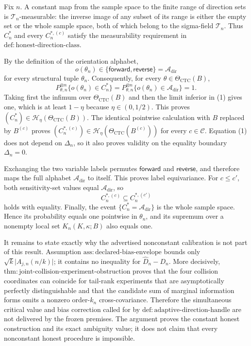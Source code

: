 Fix \(n\).  A constant map from the sample space to the finite range of direction sets is \(\mathcal T_n\)-measurable: the inverse image of any subset of its range is either the empty set or the whole sample space, both of which belong to the sigma-field \(\mathcal T_n\).  Thus \(C_n^*\) and every \(C_n^{*,(c)}\) satisfy the measurability requirement in \(\mathrm{def{:}honest\text{-}direction\text{-}class}\).

By the definition of the orientation alphabet,
\[
 o(\theta_n)\in\{\mathsf{forward},\mathsf{reverse}\}
 =\mathcal A_{\mathrm{dir}}
\]
for every structural tuple \(\theta_n\).  Consequently, for every \(\theta\in\Theta_{\mathrm{CTC}}(B)\),
\[
 P_{\theta,n}^{\otimes n}\{o(\theta_n)\in C_n^*\}
 =P_{\theta,n}^{\otimes n}\{o(\theta_n)\in\mathcal A_{\mathrm{dir}}\}=1. \tag{1}
\]
Taking first the infimum over \(\Theta_{\mathrm{CTC}}(B)\) and then the limit inferior in (1) gives one, which is at least \(1-\eta\) because \(\eta\in(0,1/2)\).  This proves \((C_n^*)\in\mathcal H_\eta(\Theta_{\mathrm{CTC}}(B))\).  The identical pointwise calculation with \(B\) replaced by \(B^{(c)}\) proves \((C_n^{*,(c)})\in\mathcal H_\eta(\Theta_{\mathrm{CTC}}(B^{(c)}))\) for every \(c\in\mathcal C\).  Equation (1) does not depend on \(\Delta_n\), so it also proves validity on the equality boundary \(\Delta_n=0\).

Exchanging the two variable labels permutes \(\mathsf{forward}\) and \(\mathsf{reverse}\), and therefore maps the full alphabet \(\mathcal A_{\mathrm{dir}}\) to itself.  This proves label equivariance.  For \(c\leq c'\), both sensitivity-set values equal \(\mathcal A_{\mathrm{dir}}\), so
\[
 C_n^{*,(c)}\subseteq C_n^{*,(c')}
\]
holds with equality.  Finally, the event \(\{C_n^*=\mathcal A_{\mathrm{dir}}\}\) is the whole sample space.  Hence its probability equals one pointwise in \(\theta_n\), and its supremum over a nonempty local set \(K_n(K,\kappa;B)\) also equals one.

It remains to state exactly why the advertised nonconstant calibration is not part of this result.  Assumption \(\mathrm{ass{:}declared\text{-}bias\text{-}envelope}\) bounds only
\(\sqrt{k}\lvert A_{j,n}(n/k)\rvert\); it contains no inequality for \(\widehat D_n-D_n\).  More decisively, \(\mathrm{thm{:}joint\text{-}collision\text{-}experiment\text{-}obstruction}\) proves that the four collision coordinates can coincide for tail-rank experiments that are asymptotically perfectly distinguishable and that the candidate sum of marginal information forms omits a nonzero order-\(k_n\) cross-covariance.  Therefore the simultaneous critical value and bias correction called for by \(\mathrm{def{:}adaptive\text{-}direction\text{-}handle}\) are not delivered by the frozen premises.  The argument proves the constant honest construction and its exact ambiguity value; it does not claim that every nonconstant honest procedure is impossible.